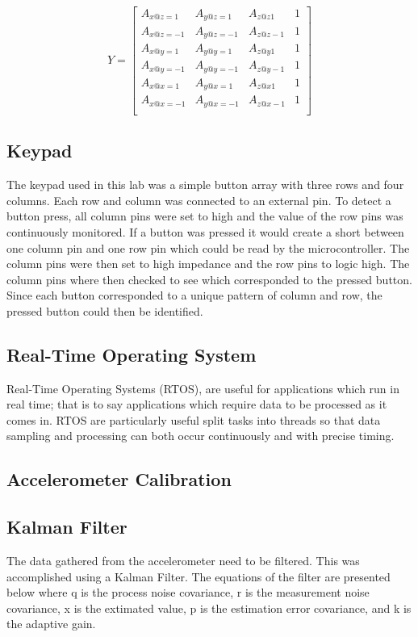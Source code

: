 \documentclass[12pt]{article}
\begin{document}
\begin{equation} \label{cal_eq:4}
 Y = \begin{bmatrix} A_{x@z=1} & A_{y@z=1} & A_{z@z1} & 1 \\
					  A_{x@z=-1} & A_{y@z=-1} & A_{z@z-1} & 1 \\
                      A_{x@y=1} & A_{y@y=1} & A_{z@y1} & 1 \\
                      A_{x@y=-1} & A_{y@y=-1} & A_{z@y-1} & 1 \\
                      A_{x@x=1} & A_{y@x=1} & A_{z@x1} & 1 \\
                      A_{x@x=-1} & A_{y@x=-1} & A_{z@x-1} & 1 \\
                      \end{bmatrix}
\end{equation}
\subsection{Keypad}
The keypad used in this lab was a simple button array with three rows and four columns. Each row and column was connected to an external pin. To detect a button press, all column pins were set to high and the value of the row pins was continuously monitored. If a button was pressed it would create a short between one column pin and one row pin which could be read by the microcontroller. The column pins were then set to high impedance and the row pins to logic high. The column pins where then checked to see which corresponded to the pressed button. Since each button corresponded to a unique pattern of column and row, the pressed button could then be identified.
\subsection{Real-Time Operating System}
Real-Time Operating Systems (RTOS), are useful for applications which run in real time; that is to say applications which require data to be processed as it comes in. RTOS are particularly useful split tasks into threads so that data sampling and processing can both occur continuously and with precise timing.
\subsection{Accelerometer Calibration}

\subsection{Kalman Filter}
The data gathered from the accelerometer need to be filtered. This was accomplished using a Kalman Filter. The equations of the filter are presented below where q is the process noise covariance, r is the measurement noise covariance, x is the extimated value, p is the estimation error covariance, and k is the adaptive gain.
\end{document}
